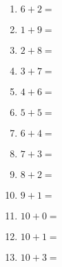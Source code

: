 \documentclass[a4paper,12pt]{article}
\begin{document}
\begin{multicols}{3}
\begin{enumerate}[label=\arabic*.]
    \item \textbf{\Large $6 + 2 =$} \underline{\hspace{1cm}} \vspace{0.5cm} %
    \vfill\null
\columnbreak
    \item \textbf{\Large $1 + 9 =$} \underline{\hspace{1cm}} \vspace{0.5cm}
    \item \textbf{\Large $2 + 8 =$} \underline{\hspace{1cm}} \vspace{0.5cm}
    \item \textbf{\Large $3 + 7 =$} \underline{\hspace{1cm}} \vspace{0.5cm} 
    \item \textbf{\Large $4 + 6 =$} \underline{\hspace{1cm}} \vspace{.5cm}
    \item \textbf{\Large $5 + 5 =$} \underline{\hspace{1cm}} \vspace{.5cm}
    \item \textbf{\Large $6 + 4 =$} \underline{\hspace{1cm}} \vspace{.5cm}
    \item \textbf{\Large $7 + 3 =$} \underline{\hspace{1cm}} \vspace{.5cm}
    \item \textbf{\Large $8 + 2 =$} \underline{\hspace{1cm}} \vspace{.5cm}
    \item \textbf{\Large $9 + 1 =$} \underline{\hspace{1cm}} \vspace{.5cm}
    \item \textbf{\Large $10 + 0 =$} \underline{\hspace{1cm}} \vspace{.5cm} %
    \vfill\null
\columnbreak
    \item \textbf{\Large $10 + 1 =$} \underline{\hspace{1cm}} \vspace{0.5cm}
    \item \textbf{\Large $10 + 3 =$} \underline{\hspace{1cm}} \vspace{0.5cm}

\end{enumerate}
\end{multicols}
\end{document}
